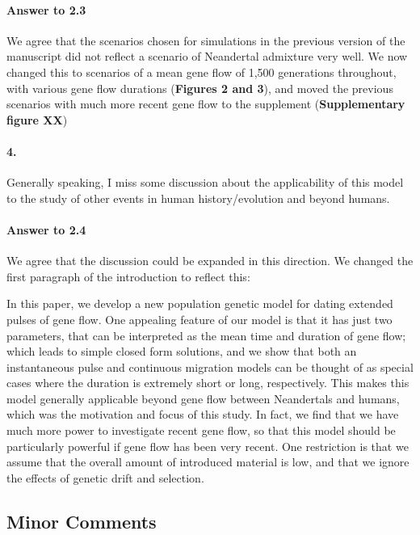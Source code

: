 \documentclass[11pt]{article}
\let\oldparagraph\paragraph
\renewcommand{\paragraph}[1]{\oldparagraph{#1}\mbox{}}
\begin{document}
\paragraph{Answer to 2.3}
We agree that the scenarios chosen for simulations in the previous version of the manuscript did not reflect a scenario of Neandertal admixture very well. We now changed this to scenarios of a mean gene flow of 1,500 generations throughout, with various gene flow durations (\textbf{Figures 2 and 3}), and moved the previous scenarios with much more recent gene flow to the supplement (\textbf{Supplementary figure XX})

\paragraph{4.}
Generally speaking, I miss some discussion about the applicability of this model to the study of other events in human history/evolution and beyond humans.

\paragraph{Answer to 2.4}
We agree that the discussion could be expanded in this direction. We changed the first paragraph of the introduction to reflect this:

\begin{mdframed}[hidealllines=true,backgroundcolor=grey!20]
In this paper, we develop a new population genetic model for dating extended pulses of gene flow. One appealing feature of our model is that it has just two parameters, that can be interpreted as the mean time and duration of gene flow; which leads to simple closed form solutions, and we show that both an instantaneous pulse and continuous migration models can be thought of as special cases where the duration is extremely short or long, respectively. This makes this model generally applicable beyond gene flow between Neandertals and humans, which was the motivation and focus of this study. In fact, we find that we have much more power to investigate recent gene flow, so that this model should be particularly powerful if gene flow has been very recent. One restriction is that we assume that the overall amount of introduced material is low, and that we ignore the effects of genetic drift and selection.\end{mdframed}



\subsection{Minor Comments}\label{Minor Comments}
\end{document}
